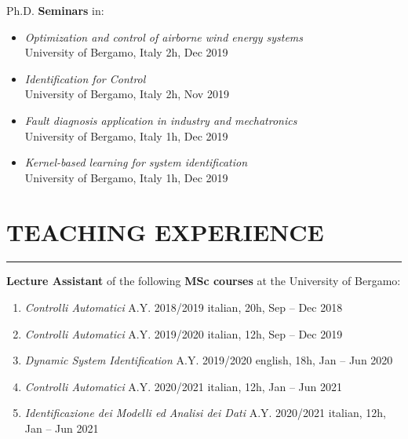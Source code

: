 \documentclass[10pt]{article}
\newcommand{\cvsection}[1]{\section*{\centering\normalsize\uppercase{#1}}\vspace{-16pt}\rule{\linewidth}{0.2pt}\vspace{6pt}}
\begin{document}
Ph.D. \textbf{Seminars} in:
\begin{itemize}
	\setlength\itemsep{-3pt}
	\renewcommand\labelitemi{$\vcenter{\hbox{\tiny$\bullet$}}$}
	\item \textit{Optimization and control of airborne wind energy systems}\\
	University of Bergamo, Italy \hfill 2h, Dec 2019\\
	\item \textit{Identification for Control}\\
	University of Bergamo, Italy \hfill 2h, Nov 2019\\
	\item \textit{Fault diagnosis application in industry and mechatronics}\\
	University of Bergamo, Italy \hfill 1h, Dec 2019\\
	\item \textit{Kernel-based learning for system identification}\\
	University of Bergamo, Italy \hfill 1h, Dec 2019\\
\end{itemize}


\cvsection{teaching experience}

\textbf{Lecture Assistant} of the following \textbf{MSc courses} at the University of Bergamo:
\begin{enumerate}
	\setlength\itemsep{-3pt}
	\item \textit{Controlli Automatici} A.Y. 2018/2019 \hfill italian, 20h, Sep – Dec 2018\\
	\item \textit{Controlli Automatici} A.Y. 2019/2020 \hfill italian, 12h, Sep – Dec 2019\\
	\item \textit{Dynamic System Identification} A.Y. 2019/2020 \hfill english, 18h, Jan – Jun 2020\\
	\item \textit{Controlli Automatici} A.Y. 2020/2021 \hfill italian, 12h, Jan – Jun 2021\\
	\item \textit{Identificazione dei Modelli ed Analisi dei Dati} A.Y. 2020/2021 \hfill italian, 12h, Jan – Jun 2021
\end{enumerate}
\end{document}
